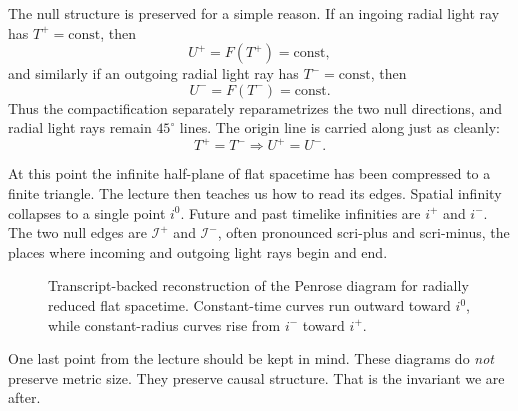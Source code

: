 The null structure is preserved for a simple reason. If an ingoing radial light ray has \(T^+=\text{const}\), then
\[
U^+=F(T^+)=\text{const},
\]
and similarly if an outgoing radial light ray has \(T^-=\text{const}\), then
\[
U^-=F(T^-)=\text{const}.
\]
Thus the compactification separately reparametrizes the two null directions, and radial light rays remain \(45^\circ\) lines. The origin line is carried along just as cleanly:
\[
T^+=T^- \Longrightarrow U^+=U^-.
\]

At this point the infinite half-plane of flat spacetime has been compressed to a finite triangle. The lecture then teaches us how to read its edges. Spatial infinity collapses to a single point \(i^0\). Future and past timelike infinities are \(i^+\) and \(i^-\). The two null edges are \(\mathcal{I}^+\) and \(\mathcal{I}^-\), often pronounced scri-plus and scri-minus, the places where incoming and outgoing light rays begin and end.

\begin{figure}[htbp]
\centering
{}
\caption{Transcript-backed reconstruction of the Penrose diagram for radially reduced flat spacetime. Constant-time curves run outward toward \(i^0\), while constant-radius curves rise from \(i^-\) toward \(i^+\).}
\end{figure}

One last point from the lecture should be kept in mind. These diagrams do \emph{not} preserve metric size. They preserve causal structure. That is the invariant we are after.

